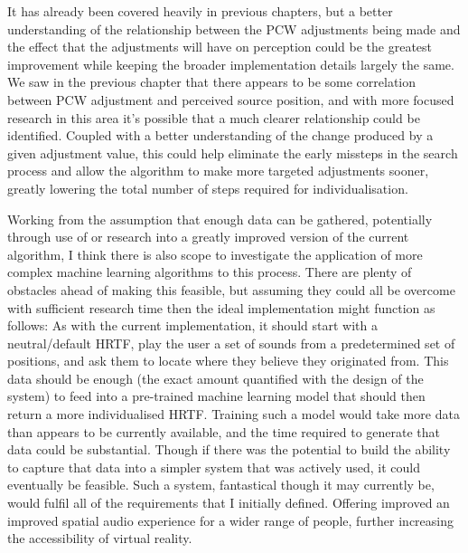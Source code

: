 It has already been covered heavily in previous chapters, but a better understanding of the relationship between the PCW adjustments being made and the effect that the adjustments will have on perception could be the greatest improvement while keeping the broader implementation details largely the same. We saw in the previous chapter that there appears to be some correlation between PCW adjustment and perceived source position, and with more focused research in this area it's possible that a much clearer relationship could be identified. Coupled with a better understanding of the change produced by a given adjustment value, this could help eliminate the early missteps in the search process and allow the algorithm to make more targeted adjustments sooner, greatly lowering the total number of steps required for individualisation.

Working from the assumption that enough data can be gathered, potentially through use of or research into a greatly improved version of the current algorithm, I think there is also scope to investigate the application of more complex machine learning algorithms to this process. There are plenty of obstacles ahead of making this feasible, but assuming they could all be overcome with sufficient research time then the ideal implementation might function as follows: As with the current implementation, it should start with a neutral/default HRTF, play the user a set of sounds from a predetermined set of positions, and ask them to locate where they believe they originated from. This data should be enough (the exact amount quantified with the design of the system) to feed into a pre-trained machine learning model that should then return a more individualised HRTF. Training such a model would take more data than appears to be currently available, and the time required to generate that data could be substantial. Though if there was the potential to build the ability to capture that data into a simpler system that was actively used, it could eventually be feasible. Such a system, fantastical though it may currently be, would fulfil all of the requirements that I initially defined. Offering improved an improved spatial audio experience for a wider range of people, further increasing the accessibility of virtual reality. 

